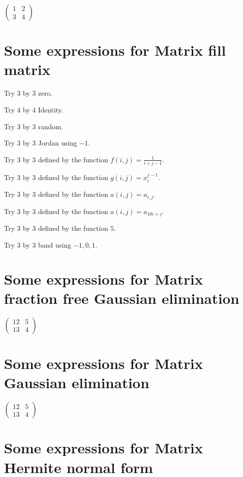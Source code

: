 \documentclass{article}
\begin{document}
$\left( 
\begin{array}{cc}
1 & 2 \\ 
3 & 4%
\end{array}%
\right) $

\section{Some expressions for Matrix fill matrix}

Try $3$ by $3$ zero.

Try $4$ by $4$ Identity.

Try $3$ by $3$ random.

Try $3$ by $3$ Jordan using $-1$.

Try $3$ by $3$ defined by the function $f\left( i,j\right) =\frac{1}{i+j-1}$.

Try $3$ by $3$ defined by the function $g\left( i,j\right) =x_{i}^{j-1}$.

Try $3$ by $3$ defined by the function $a\left( i,j\right) =a_{i,j}$.

Try $3$ by $3$ defined by the function $a\left( i,j\right) =a_{10i+j}$.

Try $3$ by $3$ defined by the function $5$.

Try $3$ by $3$ band using $-1,0,1$.

\section{Some expressions for Matrix fraction free Gaussian elimination}

$\left( 
\begin{array}{cc}
12 & 5 \\ 
13 & 4%
\end{array}%
\right) $

\section{Some expressions for Matrix Gaussian elimination}

$\left( 
\begin{array}{cc}
12 & 5 \\ 
13 & 4%
\end{array}%
\right) $

\section{Some expressions for Matrix Hermite normal form}
\end{document}
